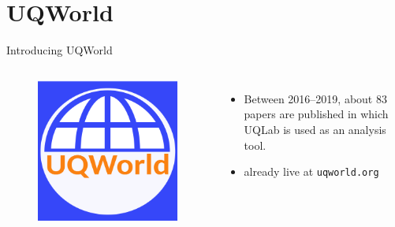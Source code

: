 \documentclass[]{rsuqbeamernew}
\begin{document}
\section{UQWorld}

\begin{frame}[t]{Introducing UQWorld}
  
  \begin{columns}
    \begin{minipage}[c][0.85\textheight][c]{\linewidth}
      \begin{figure}
        \centering
        \includegraphics[width=1.0\linewidth]{../figures/uqworld_logo.png}
      \end{figure}
    \end{minipage}
      
    \begin{itemize}
      \item Between 2016--2019, about 83 papers are published in which UQLab is used as an analysis tool.
      \item already live at \texttt{uqworld.org}
    \end{itemize}
    \hfill
  \end{columns}

\end{frame}
\end{document}
